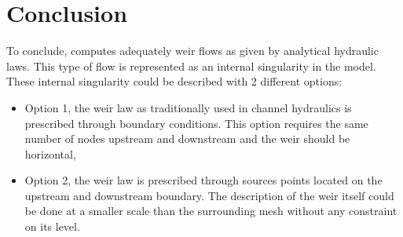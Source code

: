 \section{Conclusion}
To conclude,  computes adequately weir
flows as given by analytical hydraulic laws.
This type of flow is represented as an internal
 singularity in the model.
These internal singularity could be described with 2 different options:
\begin{itemize}
\item Option 1, the weir law as traditionally used in channel hydraulics
 is prescribed through boundary conditions. This option requires the same
 number of nodes upstream and downstream and the weir should be horizontal,
\item Option 2, the weir law is prescribed through sources points located
 on the upstream and downstream boundary. The description of the weir itself
 could be done at a smaller scale than the surrounding mesh without any
 constraint on its level.
\end{itemize}
